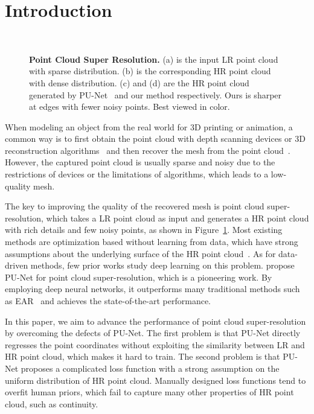 \documentclass[10pt,twocolumn,letterpaper]{article}
\begin{document}
\section{Introduction}
\begin{figure}
\begin{center}
	\\
\end{center}
	\vspace{-1.5em}
	\caption{\textbf{Point Cloud Super Resolution.} (a) is the input LR point cloud with sparse distribution. (b) is the corresponding HR point cloud with dense distribution. (c) and (d) are the HR point cloud generated by PU-Net~\cite{yu2018pu} and our method respectively. Ours is sharper at edges with fewer noisy points. Best viewed in color.}
	\vspace{-1em}
	\label{fig:pc_sr}
\end{figure}

When modeling an object from the real world for 3D printing or animation, a common way is to first obtain the point cloud with depth scanning devices or 3D reconstruction algorithms~\cite{fan2017point,hartley2003multiple} and then recover the mesh from the point cloud~\cite{bernardini1999ball}.
However, the captured point cloud is usually sparse and noisy due to the restrictions of devices or the limitations of algorithms, which leads to a low-quality mesh.

The key to improving the quality of the recovered mesh is point cloud super-resolution, which takes a LR point cloud as input and generates a HR point cloud with rich details and few noisy points, as shown in Figure~\ref{fig:pc_sr}.
Most existing methods are optimization based without learning from data, which have strong assumptions about the underlying surface of the HR point cloud~\cite{huang2009consolidation,huang2013edge}.
As for data-driven methods, few prior works study deep learning on this problem.
\cite{yu2018pu} propose PU-Net for point cloud super-resolution, which is a pioneering work.
By employing deep neural networks, it outperforms many traditional methods such as EAR~\cite{huang2013edge} and achieves the state-of-the-art performance.

In this paper, we aim to advance the performance of point cloud super-resolution by overcoming the defects of PU-Net.
The first problem is that PU-Net directly regresses the point coordinates without exploiting the similarity between LR and HR point cloud, which makes it hard to train.
The second problem is that PU-Net proposes a complicated loss function with a strong assumption on the uniform distribution of HR point cloud.
Manually designed loss functions tend to overfit human priors, which fail to capture many other properties of HR point cloud, such as continuity.
\end{document}
